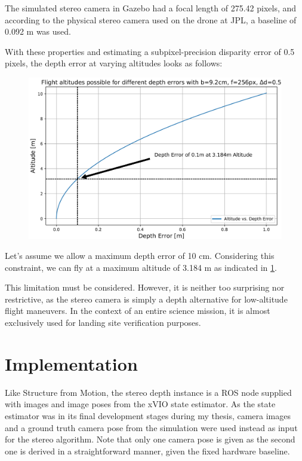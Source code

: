 The simulated stereo camera in Gazebo had a focal length of 275.42 pixels, and according to the physical stereo camera used on the drone at JPL, a baseline of 0.092 m was used.

With these properties and estimating a subpixel-precision disparity error of 0.5 pixels, the depth error at varying altitudes looks as follows:

\begin{figure}
    \centering
    \includegraphics[scale=0.24]{images/stereo_camera_depth/stereo_limit.png}
    \label{fig:stereo_limit}
\end{figure}

Let's assume we allow a maximum depth error of 10 cm. Considering this constraint, we can fly at a maximum altitude of 3.184 m as indicated in \cref{fig:stereo_limit}.

This limitation must be considered. However, it is neither too surprising nor restrictive, as the stereo camera is simply a depth alternative for low-altitude flight maneuvers. In the context of an entire science mission, it is almost exclusively used for landing site verification purposes.

\section{Implementation}

Like Structure from Motion, the stereo depth instance is a ROS node supplied with images and image poses from the xVIO state estimator. As the state estimator was in its final development stages during my thesis, camera images and a ground truth camera pose from the simulation were used instead as input for the stereo algorithm. Note that only one camera pose is given as the second one is derived in a straightforward manner, given the fixed hardware baseline.

